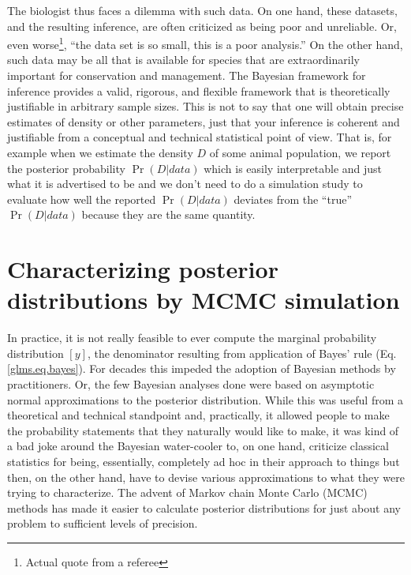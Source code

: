 The biologist thus faces a dilemma with such data. On one hand, these
datasets, and the resulting inference, are often criticized as being
poor and unreliable. Or, even worse\footnote{Actual quote from a
  referee}, ``the data set is so small, this is a poor analysis.''  On
the other hand, such data may be all that is available for species
that are extraordinarily important for conservation and management.
The Bayesian framework for inference provides a valid, rigorous, and
flexible framework that is theoretically justifiable in arbitrary
sample sizes. This is not to say that one will obtain precise
estimates of density or other parameters, just that your inference is
coherent and justifiable from a conceptual and technical statistical
point of view. That is, for example when we estimate the density $D$ of some animal population, we report the posterior probability
$\Pr(D|data)$ which is easily interpretable and just what it is
advertised to be and we don't need to do a simulation study to
evaluate how well the reported $\Pr(D|data)$ deviates from the
``true'' $\Pr(D|data)$ because they are the same quantity.

\section{Characterizing posterior distributions by MCMC simulation}

In practice, it is not really feasible to ever compute the marginal
probability distribution $[y]$, the denominator resulting from
application of Bayes' rule
(Eq. \ref{glms.eq.bayes}). For decades this impeded the adoption of
Bayesian methods by practitioners. Or, the few Bayesian analyses done
were based on asymptotic normal approximations to the posterior
distribution. While this was useful from a theoretical and
technical standpoint and, practically, it allowed people to make the
probability statements that they naturally would like to make, it was
kind of a bad joke around the Bayesian water-cooler to, on one hand,
criticize classical statistics for being, essentially, completely ad
hoc in their approach to things but then, on the other hand, have to
devise various approximations to what they were trying to
characterize. The advent of Markov chain Monte Carlo (MCMC) methods
has made it easier to calculate posterior distributions for just about
any problem to sufficient levels of precision.

